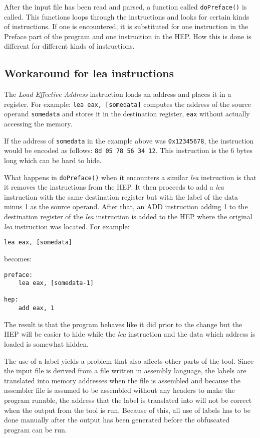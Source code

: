 \documentclass[11pt,twoside]{eitExjobb}
\begin{document}
After the input file has been read and parsed, a function called \texttt{doPreface()} is called. This functions loops through the instructions and looks for certain kinds of instructions. If one is encountered, it is substituted for one instruction in the Preface part of the program and one instruction in the HEP. How this is done is different for different kinds of instructions.  

\subsection{Workaround for lea instructions}
The \emph{Load Effective Address} instruction loads an address and places it in a register. For example: \texttt{lea eax, [somedata]} computes the address of the source operand \texttt{somedata} and stores it in the destination register, \texttt{eax} without actually accessing the memory. 

If the address of \texttt{somedata} in the example above was \texttt{0x12345678}, the instruction would be encoded as follows: \texttt{8d 05 78 56 34 12}. This instruction is the 6 bytes long which can be hard to hide. 

What happens in \texttt{doPreface()} when it encounters a similar \emph{lea} instruction is that it removes the instructions from the HEP. It then proceeds to add a \emph{lea} instruction with the same destination register but with the label of the data minus 1 as the source operand. After that, an ADD instruction adding 1 to the destination register of the \emph{lea} instruction is added to the HEP where the original \emph{lea} instruction was located. For example:

\begin{verbatim}
lea eax, [somedata]
\end{verbatim}

\noindent becomes:

\begin{verbatim}
preface:
	lea eax, [somedata-1]

hep:
	add eax, 1
\end{verbatim}

\noindent The result is that the program behaves like it did prior to the change but the HEP will be easier to hide while the \emph{lea} instruction and the data which address is loaded is somewhat hidden.

The use of a label yields a problem that also affects other parts of the tool. Since the input file is derived from a file written in assembly language, the labels are translated into memory addresses when the file is assembled and because the assembler file is assumed to be assembled without any headers to make the program runable, the address that the label is translated into will not be correct when the output from the tool is run. Because of this, all use of labels has to be done manually after the output has been generated before the obfuscated program can be run.
\end{document}
